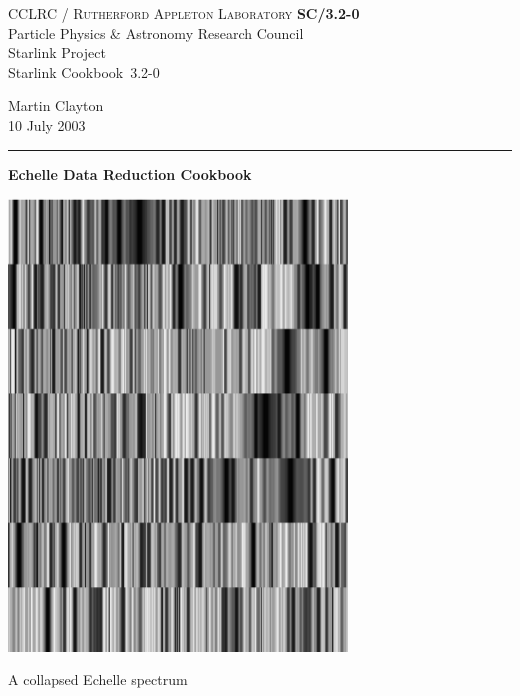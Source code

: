\documentclass[twoside,11pt]{article}
\newcommand{\stardoccategory}  {Starlink Cookbook}
\newcommand{\stardocinitials}  {SC}
\newcommand{\stardocnumber}    {3.2-0} %
\newcommand{\stardocauthors}   {Martin Clayton}
\newcommand{\stardocdate}      {10 July 2003}
\newcommand{\stardoctitle}     {Echelle Data Reduction Cookbook}
\newcommand{\stardocname}{\stardocinitials /\stardocnumber}
\newcommand{\latex}[1]{#1}
\begin{document}
\thispagestyle{empty}

\latex{
   CCLRC / \textsc{Rutherford Appleton Laboratory} \hfill \textbf{\stardocname}\\
   {\large Particle Physics \& Astronomy Research Council}\\
   {\large Starlink Project\\}
   {\large \stardoccategory\ \stardocnumber}
   \begin{flushright}
   \stardocauthors\\
   \stardocdate
   \end{flushright}
   \vspace{-4mm}
   \rule{\textwidth}{0.5mm}
   \vspace{5mm}
   \begin{center}
   {\Huge\textbf{\stardoctitle \\ [2.5ex]}}
   \end{center}
   \vspace{5mm}

   \begin{center}
   \includegraphics[height=120mm]{sc3_cover.eps}

   A collapsed Echelle spectrum
   \end{center}

}
\end{document}
